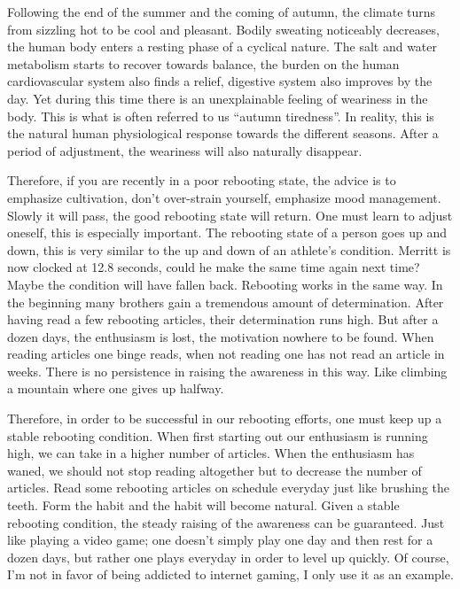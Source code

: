 \documentclass[
]{book}
\begin{document}
Following the end of the summer and the coming of autumn, the climate turns from sizzling hot to be cool and pleasant. Bodily sweating noticeably decreases, the human body enters a resting phase of a cyclical nature. The salt and water metabolism starts to recover towards balance, the burden on the human cardiovascular system also finds a relief, digestive system also improves by the day. Yet during this time there is an unexplainable feeling of weariness in the body. This is what is often referred to us ``autumn tiredness''. In reality, this is the natural human physiological response towards the different seasons. After a period of adjustment, the weariness will also naturally disappear.

Therefore, if you are recently in a poor rebooting state, the advice is to emphasize cultivation, don't over-strain yourself, emphasize mood management. Slowly it will pass, the good rebooting state will return. One must learn to adjust oneself, this is especially important. The rebooting state of a person goes up and down, this is very similar to the up and down of an athlete's condition. Merritt is now clocked at 12.8 seconds, could he make the same time again next time? Maybe the condition will have fallen back. Rebooting works in the same way. In the beginning many brothers gain a tremendous amount of determination. After having read a few rebooting articles, their determination runs high. But after a dozen days, the enthusiasm is lost, the motivation nowhere to be found. When reading articles one binge reads, when not reading one has not read an article in weeks. There is no persistence in raising the awareness in this way. Like climbing a mountain where one gives up halfway.

Therefore, in order to be successful in our rebooting efforts, one must keep up a stable rebooting condition. When first starting out our enthusiasm is running high, we can take in a higher number of articles. When the enthusiasm has waned, we should not stop reading altogether but to decrease the number of articles. Read some rebooting articles on schedule everyday just like brushing the teeth. Form the habit and the habit will become natural. Given a stable rebooting condition, the steady raising of the awareness can be guaranteed. Just like playing a video game; one doesn't simply play one day and then rest for a dozen days, but rather one plays everyday in order to level up quickly. Of course, I'm not in favor of being addicted to internet gaming, I only use it as an example.
\end{document}
